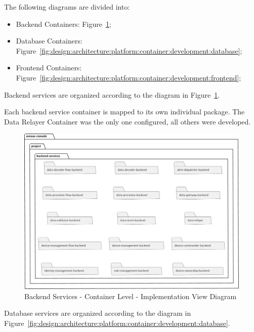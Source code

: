The following diagrams are divided into:

\begin{itemize}
   \item Backend Containers: Figure~\ref{fig:design:architecture:platform:container:development:backend};
   \item Database Containers: Figure~\ref{fig:design:architecture:platform:container:development:database};
   \item Frontend Containers: Figure~\ref{fig:design:architecture:platform:container:development:frontend};
\end{itemize}

Backend services are organized according to the diagram in Figure~\ref{fig:design:architecture:platform:container:development:backend}.

Each backend service container is mapped to its own individual package. The Data Relayer Container was the only one configured, all others were developed.

\begin{figure}[H]
   \centering
   \includegraphics[page=1,width=\columnwidth]{assets/diagrams/design/architectural/level2/development/backend.pdf}
   \caption[Container Level - Implementation View Diagram]{Backend Services - Container Level - Implementation View Diagram}
   \label{fig:design:architecture:platform:container:development:backend}
\end{figure}

Database services are organized according to the diagram in Figure~\ref{fig:design:architecture:platform:container:development:database}.

